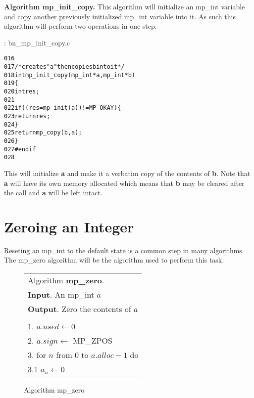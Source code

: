 \documentclass[b5paper]{book}
\begin{document}
\textbf{Algorithm mp\_init\_copy.}
This algorithm will initialize an mp\_int variable and copy another previously initialized mp\_int variable into it.  As 
such this algorithm will perform two operations in one step.  

\vspace{+3mm}\begin{small}
\hspace{-5.1mm}{\bf File}: bn\_mp\_init\_copy.c
\vspace{-3mm}
\begin{alltt}
016   
017   /* creates "a" then copies b into it */
018   int mp_init_copy (mp_int * a, mp_int * b)
019   \{
020     int     res;
021   
022     if ((res = mp_init (a)) != MP_OKAY) \{
023       return res;
024     \}
025     return mp_copy (b, a);
026   \}
027   #endif
028   
\end{alltt}
\end{small}

This will initialize \textbf{a} and make it a verbatim copy of the contents of \textbf{b}.  Note that 
\textbf{a} will have its own memory allocated which means that \textbf{b} may be cleared after the call
and \textbf{a} will be left intact.  

\section{Zeroing an Integer}
Reseting an mp\_int to the default state is a common step in many algorithms.  The mp\_zero algorithm will be the algorithm used to
perform this task.

\begin{figure}[here]
\begin{center}
\begin{tabular}{l}
\hline Algorithm \textbf{mp\_zero}. \\
\textbf{Input}.   An mp\_int $a$ \\
\textbf{Output}.  Zero the contents of $a$ \\
\hline \\
1.  $a.used \leftarrow 0$ \\
2.  $a.sign \leftarrow$ MP\_ZPOS \\
3.  for $n$ from 0 to $a.alloc - 1$ do \\
\hspace{3mm}3.1  $a_n \leftarrow 0$ \\
\hline
\end{tabular}
\end{center}
\caption{Algorithm mp\_zero}
\end{figure}
\end{document}
